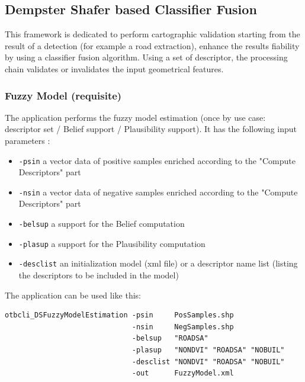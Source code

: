 \subsection{Dempster Shafer based Classifier Fusion}\label{ssec:classifierfusion}

This framework is dedicated to perform cartographic validation starting 
from the result of a detection (for example a road extraction), enhance 
the results fiability by using a classifier fusion algorithm. Using a 
set of descriptor, the processing chain validates or invalidates the 
input geometrical features. 

% 

\subsubsection{Fuzzy Model (requisite)}

The  application performs the fuzzy 
model estimation (once by use case: descriptor set / Belief support / 
Plausibility support). It has the following input parameters :
\begin{itemize}
\item \verb?-psin? a vector data of positive samples enriched according to the 
"Compute Descriptors" part
\item \verb?-nsin? a vector data of negative samples enriched according to the 
"Compute Descriptors" part
\item \verb?-belsup? a support for the Belief computation
\item \verb?-plasup? a support for the Plausibility computation
\item \verb?-desclist? an initialization model (xml file) or a descriptor name list 
(listing the descriptors to be included in the model)
\end{itemize}

The application can be used like this:
\begin{verbatim}
otbcli_DSFuzzyModelEstimation -psin     PosSamples.shp 
                              -nsin     NegSamples.shp 
                              -belsup   "ROADSA" 
                              -plasup   "NONDVI" "ROADSA" "NOBUIL" 
                              -desclist "NONDVI" "ROADSA" "NOBUIL" 
                              -out      FuzzyModel.xml
\end{verbatim}

